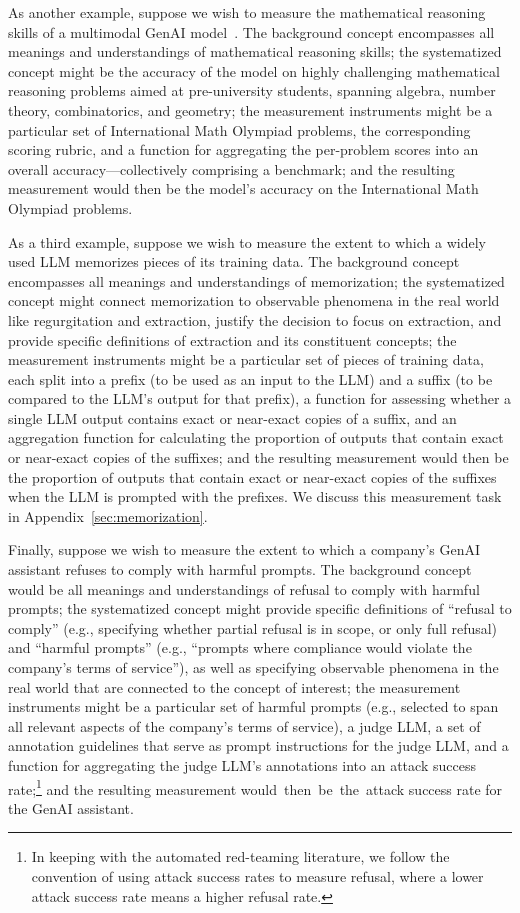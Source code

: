 \documentclass{article}
\begin{document}
As another example, suppose we wish to measure the mathematical reasoning skills of a multimodal GenAI model~\citep[e.g.,][]{he2024olympiadbench}. The background concept encompasses all meanings and understandings of mathematical reasoning skills; the systematized concept might be the accuracy of the model on highly challenging mathematical reasoning problems aimed at pre-university students, spanning algebra, number theory, combinatorics, and geometry; the measurement instruments might be a particular set of International Math Olympiad problems, the corresponding scoring rubric, and a function for aggregating the per-problem scores into an overall accuracy---collectively comprising a benchmark; and the resulting measurement would then be the model's accuracy on the International Math Olympiad problems.

As a third example, suppose we wish to measure the extent to which a widely used LLM memorizes pieces of its training data. The background concept encompasses all meanings and understandings of memorization; the systematized concept might connect memorization to observable phenomena in the real world like regurgitation and extraction, justify the decision to focus on extraction, and provide specific definitions of extraction and its constituent concepts; the measurement instruments might be a particular set of pieces of training data, each split into a prefix (to be used as an input to the LLM) and a suffix (to be compared to the LLM's output for that prefix), a function for assessing whether a single LLM output contains exact or near-exact copies of a suffix, and an aggregation function for calculating the proportion of outputs that contain exact or near-exact copies of the suffixes; and the resulting measurement would then be the proportion of outputs that contain exact or near-exact copies of the suffixes when the LLM is prompted with the prefixes. We discuss this measurement task in Appendix~\ref{sec:memorization}.

Finally, suppose we wish to measure the extent to which a company's GenAI assistant refuses to comply with harmful prompts. The background concept would be all meanings and understandings of refusal to comply with harmful prompts; the systematized concept might provide specific definitions of ``refusal to comply'' (e.g., specifying whether partial refusal is in scope, or only full refusal) and ``harmful prompts'' (e.g., ``prompts where compliance would violate the company's terms of service''), as well as specifying observable phenomena in the real world that are connected to the concept of interest; the measurement instruments might be a particular set of harmful prompts (e.g., selected to span all relevant aspects of the company's terms of service), a judge LLM, a set of annotation guidelines that serve as prompt instructions for the judge LLM, and a function for aggregating the judge LLM's annotations into an attack success rate;\footnote{In keeping with the automated red-teaming literature, we follow the convention of using attack success rates to measure refusal, where a lower attack success rate means a higher refusal rate.} and the resulting measurement would~then~be~the~attack success rate for the GenAI assistant.
\end{document}
